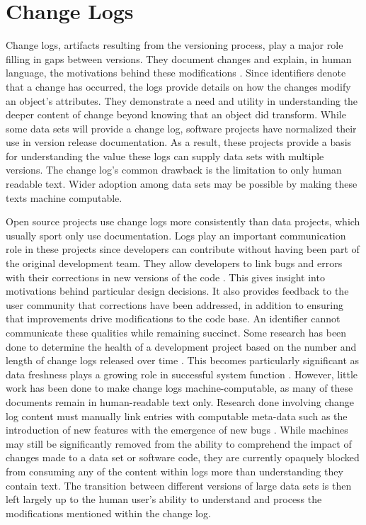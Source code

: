 \section{Change Logs} \label{sec:changelog}

Change logs, artifacts resulting from the versioning process, play a major role filling in gaps between versions.
They document changes and explain, in human language, the motivations behind these modifications \cite{uel1037}.
Since identifiers denote that a change has occurred, the logs provide details on how the changes modify an object's attributes.
They demonstrate a need and utility in understanding the deeper content of change beyond knowing that an object did transform.
While some data sets will provide a change log, software projects have normalized their use in version release documentation.
As a result, these projects provide a basis for understanding the value these logs can supply data sets with multiple versions.
The change log's common drawback is the limitation to only human readable text.
Wider adoption among data sets may be possible by making these texts machine computable.

Open source projects use change logs more consistently than data projects, which usually sport only use documentation.
Logs play an important communication role in these projects since developers can contribute without having been part of the original development team.
They allow developers to link bugs and errors with their corrections in new versions of the code \cite{Chen:2004:OCL:990374.990391}.
This gives insight into motivations behind particular design decisions.
It also provides feedback to the user community that corrections have been addressed, in addition to ensuring that improvements drive modifications to the code base.
An identifier cannot communicate these qualities while remaining succinct.
Some research has been done to determine the health of a development project based on the number and length of change logs released over time \cite{German03automatingthe}.
This becomes particularly significant as data freshness plays a growing role in successful system function \cite{Bouzeghoub:2004:FAD:1012453.1012464}.
However, little work has been done to make change logs machine-computable, as many of these documents remain in human-readable text only.
Research done involving change log content must manually link entries with computable meta-data such as the introduction of new features with the emergence of new bugs \cite{6132954}.
While machines may still be significantly removed from the ability to comprehend the impact of changes made to a data set or software code, they are currently opaquely blocked from consuming any of the content within logs more than understanding they contain text.
The transition between different versions of large data sets is then left largely up to the human user's ability to understand and process the modifications mentioned within the change log.

